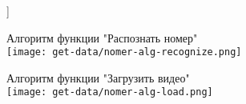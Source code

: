 ]{

	\centering
	\begin{minipage}{.4\textwidth}
		\centering
		\vspace{6cm}
		Алгоритм функции "Распознать номер"\\[2cm]
		\texttt{[image: get-data/nomer-alg-recognize.png]}
	\end{minipage}
	\hspace{4cm}
	\begin{minipage}{.4\textwidth}
		\centering
		Алгоритм функции "Загрузить видео"\\[2cm]
		\texttt{[image: get-data/nomer-alg-load.png]}
	\end{minipage}


}


